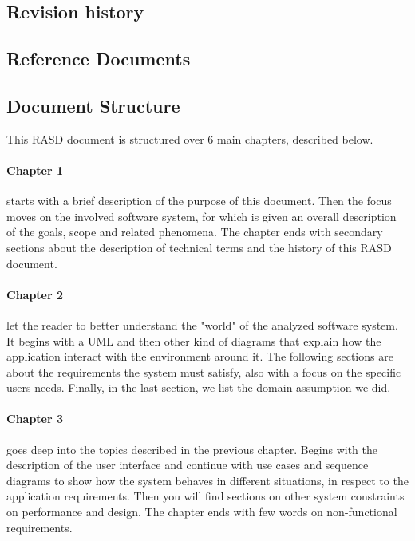 \documentclass[]{article}
\begin{document}
	
	
	
	\subsection{Revision history}	
	\subsection{Reference Documents}
	
	\subsection{Document Structure}
	
	This RASD document is structured over 6 main chapters, described below.
	
	\paragraph{Chapter 1} starts with a brief description of the purpose of this document. Then the focus moves on the involved software system, for which is given an overall description of the goals, scope and related phenomena. The chapter ends with secondary sections about the description of technical terms and the history of this RASD document.
	
	\paragraph{Chapter 2} let the reader to better understand the "world" of the analyzed software system. It begins with a UML and then other kind of diagrams that explain how the application interact with the environment around it. The following sections are about the requirements the system must satisfy, also with a focus on the specific users needs. Finally, in the last section, we list the domain assumption we did.
	
	\paragraph{Chapter 3} goes deep into the topics described in the previous chapter.
	Begins with the description of the user interface and continue with use cases and sequence diagrams to show how the system behaves in different situations, in respect to the application requirements. Then you will find sections on other system constraints on performance and design. The chapter ends with few words on non-functional requirements.
	
\end{document}
